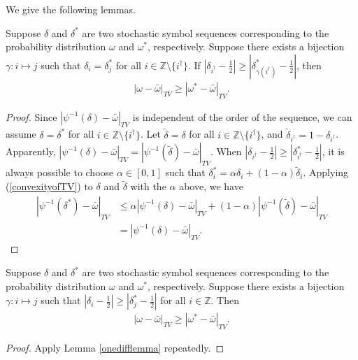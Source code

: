We give the following lemmas.

\begin{lemma}
\label{onedifflemma} Suppose $\delta$ and $\delta^*$ are two stochastic symbol sequences corresponding
to the probability distribution $\omega$ and $\omega^*$, respectively. Suppose there exists a
bijection $\gamma: i \mapsto j$ such that $\delta_i = \delta^*_j$ for all $i\in
\mathbb{Z}\setminus\{i^\dagger\}$. If $ |\delta_{i^\dagger}-\frac{1}{2}| \ge |\delta^*_{\gamma(i^\dagger)}-\frac{1}{2}|$, then
 \begin{eqnarray}
      |\omega-\bar{\omega} |_{TV} \ge |\omega^*-\bar{\omega} |_{TV}.
 \end{eqnarray}
\end{lemma}
\begin{proof} Since $|\psi^{-1}(\delta)-\bar{\omega}|_{TV}$ is independent of the order of the sequence, we can assume
$\delta = \delta^*$ for all $i\in \mathbb{Z}\setminus\{i^\dagger\}$. Let $\tilde{\delta} = \delta$
for all $i\in \mathbb{Z}\setminus\{i^\dagger\}$, and
$\tilde{\delta}_{i^\dagger}=1-\delta_{i^\dagger}$. Apparently,
$|\psi^{-1}(\delta)-\bar{\omega}|_{TV} =|\psi^{-1}(\tilde{\delta})-\bar{\omega}|_{TV} $. When
$|\delta_{i^\dagger}-\frac{1}{2}| \ge |\delta^*_{i^\dagger}-\frac{1}{2}|$, it is always possible to
choose $\alpha\in[0,1]$ such that  $\delta^*_i = \alpha \delta_i +(1-\alpha) \tilde{\delta}_i $.
Applying (\ref{convexityofTV}) to $\delta$ and $\tilde{\delta}$ with the $\alpha$ above, we have
\begin{align}
    |\psi^{-1}(\delta^*)-\bar{\omega}|_{TV}
                 &\le  \alpha|\psi^{-1}(\delta)-\bar{\omega} |_{TV}+(1-\alpha)|\psi^{-1}(\tilde{\delta})-\bar{\omega}|_{TV} \nonumber\\
                 & =  |\psi^{-1}(\delta)-\bar{\omega} |_{TV}.
 \end{align}
\end{proof}

\begin{lemma}
\label{alldifflemma} Suppose $\delta$ and $\delta^*$ are two stochastic symbol sequences corresponding
to the probability distribution $\omega$ and $\omega^*$, respectively. Suppose there exists a
bijection $\gamma: i \mapsto j$ such that $|\delta_i-\frac{1}{2}| \ge |\delta^*_j-\frac{1}{2} |$ for
all $i\in \mathbb{Z}$. Then
 \begin{eqnarray}
   |\omega-\bar{\omega} |_{TV} \ge|\omega^*-\bar{\omega} |_{TV}.
 \end{eqnarray}
\end{lemma}
\begin{proof} Apply Lemma \ref{onedifflemma} repeatedly.
\end{proof}

